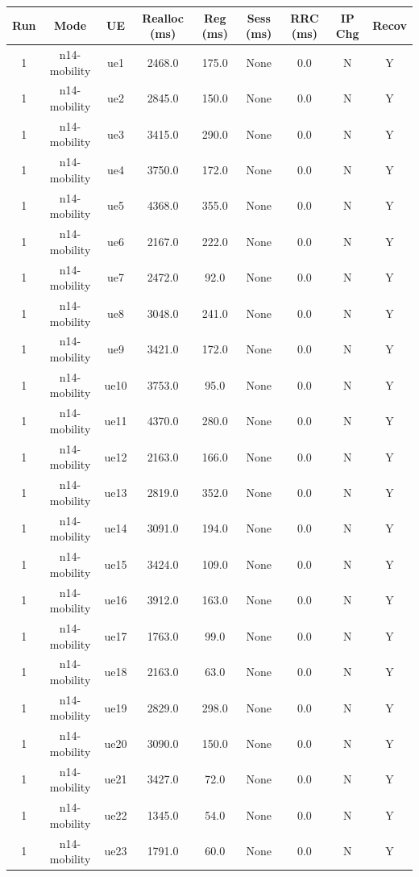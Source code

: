 \begin{table}[ht]
\centering
\begin{tabular}{|c|c|c|c|c|c|c|c|c|}
\hline
Run & Mode & UE & Realloc (ms) & Reg (ms) & Sess (ms) & RRC (ms) & IP Chg & Recov \\
\hline
1 & n14-mobility & ue1 & 2468.0 & 175.0 & None & 0.0 & N & Y \\
1 & n14-mobility & ue2 & 2845.0 & 150.0 & None & 0.0 & N & Y \\
1 & n14-mobility & ue3 & 3415.0 & 290.0 & None & 0.0 & N & Y \\
1 & n14-mobility & ue4 & 3750.0 & 172.0 & None & 0.0 & N & Y \\
1 & n14-mobility & ue5 & 4368.0 & 355.0 & None & 0.0 & N & Y \\
1 & n14-mobility & ue6 & 2167.0 & 222.0 & None & 0.0 & N & Y \\
1 & n14-mobility & ue7 & 2472.0 & 92.0 & None & 0.0 & N & Y \\
1 & n14-mobility & ue8 & 3048.0 & 241.0 & None & 0.0 & N & Y \\
1 & n14-mobility & ue9 & 3421.0 & 172.0 & None & 0.0 & N & Y \\
1 & n14-mobility & ue10 & 3753.0 & 95.0 & None & 0.0 & N & Y \\
1 & n14-mobility & ue11 & 4370.0 & 280.0 & None & 0.0 & N & Y \\
1 & n14-mobility & ue12 & 2163.0 & 166.0 & None & 0.0 & N & Y \\
1 & n14-mobility & ue13 & 2819.0 & 352.0 & None & 0.0 & N & Y \\
1 & n14-mobility & ue14 & 3091.0 & 194.0 & None & 0.0 & N & Y \\
1 & n14-mobility & ue15 & 3424.0 & 109.0 & None & 0.0 & N & Y \\
1 & n14-mobility & ue16 & 3912.0 & 163.0 & None & 0.0 & N & Y \\
1 & n14-mobility & ue17 & 1763.0 & 99.0 & None & 0.0 & N & Y \\
1 & n14-mobility & ue18 & 2163.0 & 63.0 & None & 0.0 & N & Y \\
1 & n14-mobility & ue19 & 2829.0 & 298.0 & None & 0.0 & N & Y \\
1 & n14-mobility & ue20 & 3090.0 & 150.0 & None & 0.0 & N & Y \\
1 & n14-mobility & ue21 & 3427.0 & 72.0 & None & 0.0 & N & Y \\
1 & n14-mobility & ue22 & 1345.0 & 54.0 & None & 0.0 & N & Y \\
1 & n14-mobility & ue23 & 1791.0 & 60.0 & None & 0.0 & N & Y \\

\end{tabular}
\end{table}
